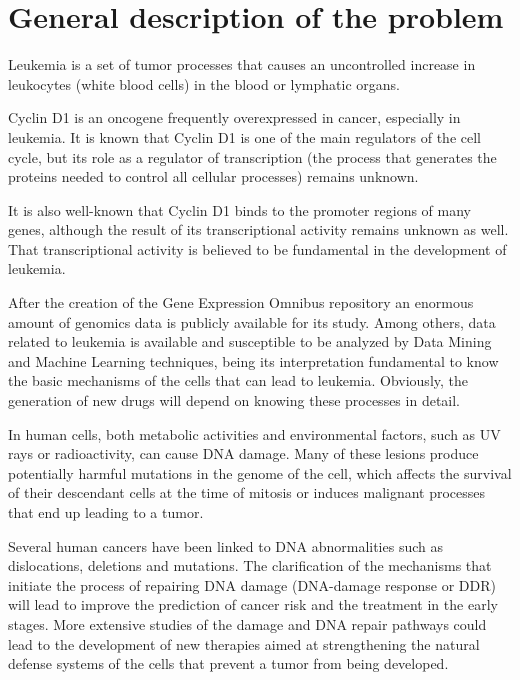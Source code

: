 \onehalfspacing

\section{General description of the problem}

Leukemia is a set of tumor processes that causes an uncontrolled increase in leukocytes (white blood cells) in the blood or lymphatic organs.

Cyclin D1 is an oncogene frequently overexpressed in cancer, especially in leukemia.
It is known that Cyclin D1 is one of the main regulators of the cell cycle, but its role as a regulator of transcription (the process that generates the proteins needed to control all cellular processes) remains unknown.

It is also well-known that Cyclin D1 binds to the promoter regions of many genes, although the result of its transcriptional activity remains unknown as well. That transcriptional activity is believed to be fundamental in the development of leukemia.

After the creation of the Gene Expression Omnibus repository\cite{Clough2016}\cite{Barrett2013} an enormous amount of genomics data is publicly available for its study. Among others, data related to leukemia is available and susceptible to be analyzed by Data Mining and Machine Learning techniques, being its interpretation fundamental to know the basic mechanisms of the cells that can lead to leukemia.
Obviously, the generation of new drugs will depend on knowing these processes in detail.

In human cells, both metabolic activities and environmental factors, such as UV rays or radioactivity, can cause DNA damage. Many of these lesions produce potentially harmful mutations in the genome of the cell, which affects the survival of their descendant cells at the time of mitosis or induces malignant processes that end up leading to a tumor.

Several human cancers have been linked to DNA abnormalities such as dislocations, deletions and mutations. The clarification of the mechanisms that initiate the process of repairing DNA damage (DNA-damage response or DDR) will lead to improve the prediction of cancer risk and the treatment in the early stages. More extensive studies of the damage and DNA repair pathways could lead to the development of new therapies aimed at strengthening the natural defense systems of the cells that prevent a tumor from being developed.

